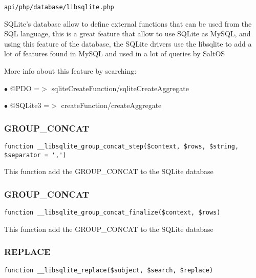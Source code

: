 \documentclass[a4paper]{article}
\begin{document}
\begin{lstlisting}
api/php/database/libsqlite.php
\end{lstlisting}

SQLite's database allow to define external functions that can be used from the SQL language,
this is a great feature that allow to use SQLite as MySQL, and using this feature of the
database, the SQLite drivers use the libsqlite to add a lot of features found in MySQL and
used in a lot of queries by SaltOS

More info about this feature by searching:

\begin{compactitem}
\item[\color{myblue}$\bullet$] @PDO     =$>$ sqliteCreateFunction/sqliteCreateAggregate
\item[\color{myblue}$\bullet$] @SQLite3 =$>$ createFunction/createAggregate
\end{compactitem}

\hypertarget{toc293}{}
\subsubsection{GROUP\_CONCAT}

\begin{lstlisting}
function __libsqlite_group_concat_step($context, $rows, $string, $separator = ',')
\end{lstlisting}

This function add the GROUP\_CONCAT to the SQLite database

\hypertarget{toc294}{}
\subsubsection{GROUP\_CONCAT}

\begin{lstlisting}
function __libsqlite_group_concat_finalize($context, $rows)
\end{lstlisting}

This function add the GROUP\_CONCAT to the SQLite database

\hypertarget{toc295}{}
\subsubsection{REPLACE}

\begin{lstlisting}
function __libsqlite_replace($subject, $search, $replace)
\end{lstlisting}
\end{document}

